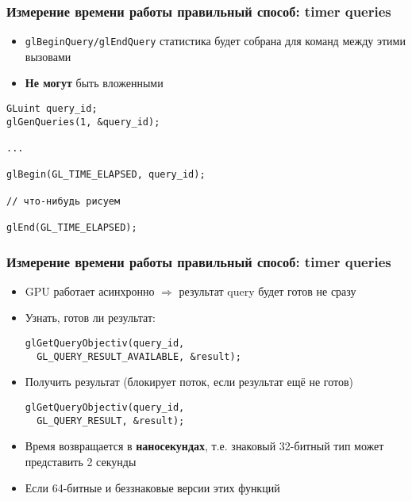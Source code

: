 \documentclass{beamer}
\begin{document}
\begin{frame}[fragile]
\frametitle{Измерение времени работы \textendash{} правильный способ: timer queries}
\begin{itemize}
\item \verb|glBeginQuery/glEndQuery| \textendash{} статистика будет собрана для команд между этими вызовами
\pause
\item \textbf{Не могут} быть вложенными
\end{itemize}
\pause
\begin{verbatim}
GLuint query_id;
glGenQueries(1, &query_id);

...

glBegin(GL_TIME_ELAPSED, query_id);

// что-нибудь рисуем

glEnd(GL_TIME_ELAPSED);
\end{verbatim}
\end{frame}

\begin{frame}[fragile]
\frametitle{Измерение времени работы \textendash{} правильный способ: timer queries}
\begin{itemize}
\item GPU работает асинхронно \begin{math}\Rightarrow\end{math} результат query будет готов не сразу
\pause
\item Узнать, готов ли результат:
\begin{verbatim}
glGetQueryObjectiv(query_id,
  GL_QUERY_RESULT_AVAILABLE, &result);
\end{verbatim}
\pause
\item Получить результат (блокирует поток, если результат ещё не готов)
\begin{verbatim}
glGetQueryObjectiv(query_id,
  GL_QUERY_RESULT, &result);
\end{verbatim}
\pause
\item Время возвращается в \textbf{наносекундах}, т.е. знаковый 32-битный тип может представить 2 секунды
\pause
\item Если 64-битные и беззнаковые версии этих функций
\end{itemize}
\end{frame}
\end{document}
